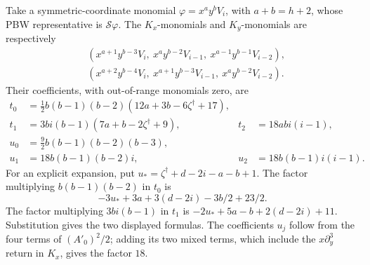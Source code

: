 \documentclass[11pt]{article}
\theoremstyle{plain}
\theoremstyle{definition}
\theoremstyle{remark}
\numberwithin{equation}{section}
\begin{document}
Take a symmetric-coordinate monomial \(\varphi=x^ay^bV_i\),
with \(a+b=h+2\), whose PBW representative is \(\mathscr S\varphi\).
The \(K_x\)-monomials and \(K_y\)-monomials are respectively
\[
\begin{aligned}
 &(x^{a+1}y^{b-3}V_i,\ x^ay^{b-2}V_{i-1},\
                                  x^{a-1}y^{b-1}V_{i-2}),\\
 &(x^{a+2}y^{b-4}V_i,\ x^{a+1}y^{b-3}V_{i-1},\
                                  x^ay^{b-2}V_{i-2}).
\end{aligned}
\]
Their coefficients, with out-of-range monomials zero, are
\begin{equation}\label{eq:natural-six-coefficients}
\begin{aligned}
 t_0&=\tfrac12b(b-1)(b-2)(12a+3b-6\zeta^\dagger+17),\\
 t_1&=3bi(b-1)(7a+b-2\zeta^\dagger+9),&
 t_2&=18abi(i-1),\\
 u_0&=\tfrac92b(b-1)(b-2)(b-3),\\
 u_1&=18b(b-1)(b-2)i,&u_2&=18b(b-1)i(i-1).
\end{aligned}
\end{equation}
For an explicit expansion, put
\(u_*=\zeta^\dagger+d-2i-a-b+1\).
The factor multiplying \(b(b-1)(b-2)\) in \(t_0\) is
\[
 -3u_*+3a+3(d-2i)-3b/2+23/2 .
\]
The factor multiplying \(3bi(b-1)\) in \(t_1\) is
\(-2u_*+5a-b+2(d-2i)+11\).
Substitution gives the two displayed formulas.
The coefficients \(u_j\) follow from the four terms of
\((A'_0)^2/2\); adding its two mixed terms, which include the
\(x\partial_y^3\) return in \(K_x\), gives the factor \(18\).
\end{document}
